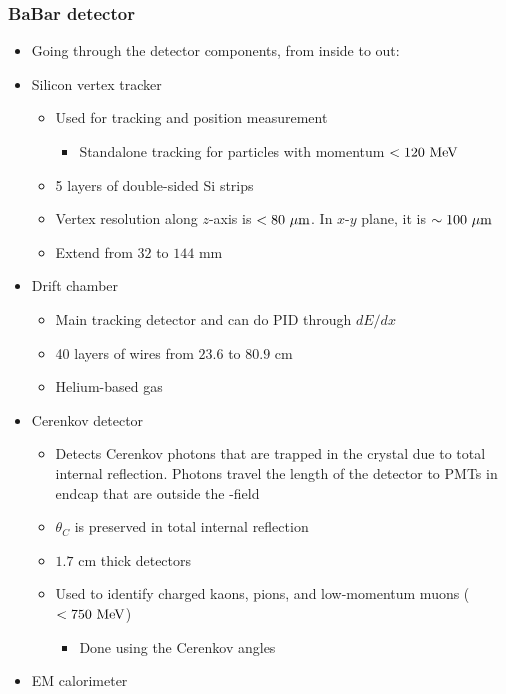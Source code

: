 \subsubsection{BaBar detector}
\begin{itemize}
  \item Going through the detector components, from inside to out:
  \item Silicon vertex tracker
  \begin{itemize}
    \item Used for tracking and position measurement
    \begin{itemize}
      \item Standalone tracking for particles with momentum $<120~\text{MeV}$
    \end{itemize}
    \item 5 layers of double-sided Si strips
    \item Vertex resolution along $z$-axis is $<80~\mu\text{m}$. In $x$-$y$ plane, it is $\sim 100~\mu\text{m}$
    \item Extend from $32$ to $144$ mm
  \end{itemize}
  \item Drift chamber
  \begin{itemize}
    \item Main tracking detector and can do PID through $dE/dx$
    \item 40 layers of wires from $23.6$ to $80.9$ cm
    \item Helium-based gas
  \end{itemize}
  \item Cerenkov detector
  \begin{itemize}
    \item Detects Cerenkov photons that are trapped in the crystal due to total internal reflection. Photons travel the length of the detector to PMTs in endcap that are outside the \B-field
    \item $\theta_C$ is preserved in total internal reflection
    \item $1.7$ cm thick detectors
    \item Used to identify charged kaons, pions, and low-momentum muons ($<750~\text{MeV}$)
    \begin{itemize}
      \item Done using the Cerenkov angles
    \end{itemize}
  \end{itemize}
  \item EM calorimeter

\end{itemize}
